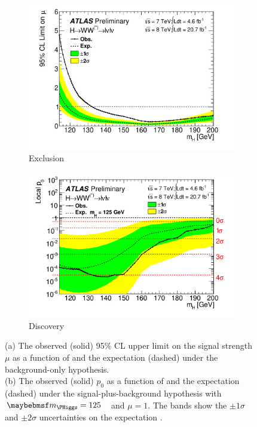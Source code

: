 \begin{figure}[t]
	\begin{subfigure}[b]{0.495\textwidth}
		\centering
		\includegraphics[width=\textwidth]{tex/results/Mor13_CLs}
		\caption{Exclusion}
		\label{fig:results:CLs}
	\end{subfigure}
	\hfill
	\begin{subfigure}[b]{0.495\textwidth}
		\centering
		\includegraphics[width=\textwidth]{tex/results/Mor13_p0}
		\caption{Discovery}
		\label{fig:results:p0}
	\end{subfigure}
	\caption{(a) The observed (solid) 95\% CL upper limit on the signal strength $\mu$ as a 
	function of \mH and the expectation (dashed) under the background-only hypothesis. \\
	(b) The observed (solid) $p_0$ as a function of \mH and the expectation (dashed) under 
	the signal-plus-background hypothesis with \unit{$\mH = 125$}{\GeV} and $\mu = 1$.
	The bands show the $\pm1\sigma$ and $\pm2\sigma$ uncertainties on the expectation 
	\cite{HWW-Moriond}.}
\end{figure}

